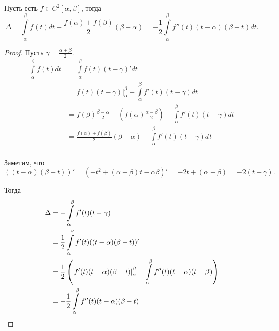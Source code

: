 \begin{lemma} 
    Пусть есть $f\in C^2\left[\alpha, \beta\right]$, тогда
    \[ \Delta = \int\limits_{\alpha}^{\beta} f(t)dt - \frac{f(\alpha) + f(\beta)}{2}(\beta - \alpha) = -\frac{1}{2}\int\limits_{\alpha}^{\beta} f''(t)(t-\alpha)(\beta-t)dt    .\] 
\begin{proof}
    Пусть $\gamma = \frac{\alpha + \beta}{2}$.
    \begin{equation*}
        \begin{split}
            \int\limits_{\alpha}^{\beta} f(t)dt 
            &= \int\limits_{\alpha}^{\beta} f(t)(t-\gamma)'dt\\ 
            &= \left. f(t)(t-\gamma)\right|_{\alpha}^{\beta} - \int\limits_{\alpha}^{\beta} f'(t)(t-\gamma)dt\\
            &= f(\beta) \frac{\beta-\alpha}{2} - \left( f(\alpha) \frac{\alpha - \beta}{2} \right) - \int\limits_{\alpha}^{\beta} f'(t)(t-\gamma)dt\\
            &= \frac{f(\alpha)+f(\beta)}{2}\left( \beta-\alpha \right) - \int\limits_{\alpha}^{\beta} f'(t)(t-\gamma)dt\\
        \end{split}
    \end{equation*}
    
    Заметим, что 
    \[ ((t-\alpha)(\beta-t))' = (-t^2 + (\alpha + \beta)t - \alpha\beta)' = -2t + (\alpha + \beta) = -2(t-\gamma) .\]

    Тогда
    \begin{equation*}
        \begin{split}
            \Delta
            &= -\int\limits_{\alpha}^{\beta} f'(t)(t-\gamma)\\
            &= \frac{1}{2} \int\limits_{\alpha}^{\beta} f'(t)((t-\alpha)(\beta-t))'\\
            &= \frac{1}{2} \left( \left. f'(t)(t-\alpha)(\beta-t)\right|_{\alpha}^{\beta} - \int\limits_{\alpha}^{\beta} f''(t)(t-\alpha)(t-\beta)   \right)\\
            &= -\frac{1}{2} \int\limits_{\alpha}^{\beta}  f''(t)(t-\alpha)(\beta-t) \qedhere
        \end{split}
    \end{equation*}
\end{proof}
\end{lemma}
